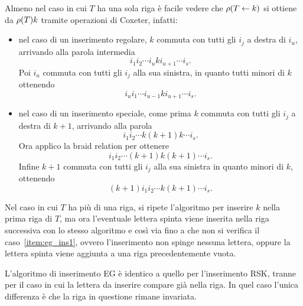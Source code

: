 \begin{remark} 
    \label{rmk:coxeter_righe}
    Almeno nel caso in cui $T$ ha una sola riga \`e facile vedere che 
    $\operatorname{\rho}(T \leftarrow k)$ si ottiene da $\operatorname{\rho}(T)k$ tramite operazioni
    di Coxeter, infatti:
    \begin{itemize}
        \item nel 
            caso di un inserimento regolare,
            $k$ commuta con tutti gli $i_j$ a destra di $i_u$,
            arrivando alla parola intermedia
            \[
                i_1 i_2 \cdots i_u k i_{u+1} \cdots i_s.
            \]
            Poi $i_u$ commuta con tutti gli $i_j$
            alla sua sinistra, in quanto tutti minori di $k$ ottenendo
            \[
                i_u i_1 \cdots i_{u-1} k i_{u+1} \cdots i_s.
            \]
        \item nel 
            caso di un inserimento speciale,
            come prima $k$ commuta con tutti gli $i_j$
            a destra di $k+1$, arrivando alla parola
            \[
                i_1 i_2 \cdots k (k+1) k \cdots i_s.
            \]
            Ora applico la braid relation per ottenere
            \[
                i_1 i_2 \cdots  (k+1) k (k+1) \cdots i_s.
            \]
            Infine $k+1$ commuta con tutti gli $i_j$ alla sua sinistra in quanto minori
            di $k$, ottenendo
            \[
                (k+1) i_1 i_2 \cdots k (k+1) \cdots i_s.
            \]
    \end{itemize}
\end{remark}

Nel caso in cui $T$ ha pi\`u di una riga, si ripete l'algoritmo per inserire $k$
nella prima riga di $T$, ma ora l'eventuale lettera spinta viene inserita
nella riga successiva con lo stesso algoritmo e cos\`i via fino a che non si verifica
il caso~\ref{item:eg_ins1}, ovvero l'inserimento
non spinge nessuna lettera, oppure la lettera spinta viene aggiunta a 
una riga precedentemente vuota.


\begin{remark}
    L'algoritmo di inserimento EG \`e identico a quello per l'inserimento RSK, 
    tranne per il caso in cui la lettera da inserire compare già nella riga.
    In quel caso l'unica differenza \`e che la riga in questione rimane invariata.
\end{remark}


